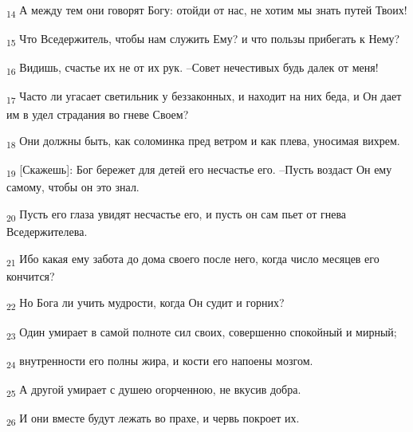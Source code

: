 \begin{tcolorbox}
\textsubscript{14} А между тем они говорят Богу: отойди от нас, не хотим мы знать путей Твоих!
\end{tcolorbox}
\begin{tcolorbox}
\textsubscript{15} Что Вседержитель, чтобы нам служить Ему? и что пользы прибегать к Нему?
\end{tcolorbox}
\begin{tcolorbox}
\textsubscript{16} Видишь, счастье их не от их рук. --Совет нечестивых будь далек от меня!
\end{tcolorbox}
\begin{tcolorbox}
\textsubscript{17} Часто ли угасает светильник у беззаконных, и находит на них беда, и Он дает им в удел страдания во гневе Своем?
\end{tcolorbox}
\begin{tcolorbox}
\textsubscript{18} Они должны быть, как соломинка пред ветром и как плева, уносимая вихрем.
\end{tcolorbox}
\begin{tcolorbox}
\textsubscript{19} [Скажешь]: Бог бережет для детей его несчастье его. --Пусть воздаст Он ему самому, чтобы он это знал.
\end{tcolorbox}
\begin{tcolorbox}
\textsubscript{20} Пусть его глаза увидят несчастье его, и пусть он сам пьет от гнева Вседержителева.
\end{tcolorbox}
\begin{tcolorbox}
\textsubscript{21} Ибо какая ему забота до дома своего после него, когда число месяцев его кончится?
\end{tcolorbox}
\begin{tcolorbox}
\textsubscript{22} Но Бога ли учить мудрости, когда Он судит и горних?
\end{tcolorbox}
\begin{tcolorbox}
\textsubscript{23} Один умирает в самой полноте сил своих, совершенно спокойный и мирный;
\end{tcolorbox}
\begin{tcolorbox}
\textsubscript{24} внутренности его полны жира, и кости его напоены мозгом.
\end{tcolorbox}
\begin{tcolorbox}
\textsubscript{25} А другой умирает с душею огорченною, не вкусив добра.
\end{tcolorbox}
\begin{tcolorbox}
\textsubscript{26} И они вместе будут лежать во прахе, и червь покроет их.
\end{tcolorbox}
